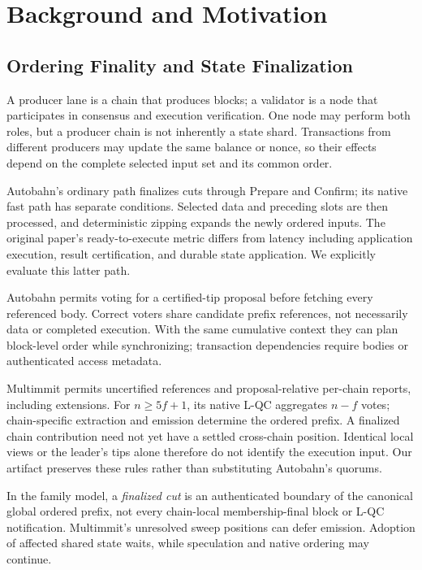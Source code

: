 \section{Background and Motivation}
\label{sec:background}

\subsection{Ordering Finality and State Finalization}

A producer lane is a chain that produces blocks; a validator is a node that participates in consensus and execution verification. One node may perform both roles, but a producer chain is not inherently a state shard. Transactions from different producers may update the same balance or nonce, so their effects depend on the complete selected input set and its common order.

Autobahn's ordinary path finalizes cuts through Prepare and Confirm; its native fast path has separate conditions. Selected data and preceding slots are then processed, and deterministic zipping expands the newly ordered inputs. The original paper's ready-to-execute metric differs from latency including application execution, result certification, and durable state application. We explicitly evaluate this latter path. \citep{autobahn}

Autobahn permits voting for a certified-tip proposal before fetching every referenced body. Correct voters share candidate prefix references, not necessarily data or completed execution. With the same cumulative context they can plan block-level order while synchronizing; transaction dependencies require bodies or authenticated access metadata. \citep[Section 5.2]{autobahn}

Multimmit permits uncertified references and proposal-relative per-chain reports, including extensions. For \(n\geq5f+1\), its native L-QC aggregates \(n-f\) votes; chain-specific extraction and emission determine the ordered prefix. A finalized chain contribution need not yet have a settled cross-chain position. Identical local views or the leader's tips alone therefore do not identify the execution input. Our artifact preserves these rules rather than substituting Autobahn's quorums. \citep{multimmit}

In the family model, a \emph{finalized cut} is an authenticated boundary of the canonical global ordered prefix, not every chain-local membership-final block or L-QC notification. Multimmit's unresolved sweep positions can defer emission. Adoption of affected shared state waits, while speculation and native ordering may continue.

